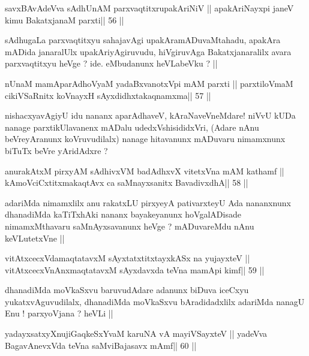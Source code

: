 \begin{shl}
savxBAvAdeVva sAdhUnAM parxvaqtitxrupakAriNiV ||
apakAriNayxpi janeV kimu BakatxjanaM parxti\hfill || 56 ||
\end{shl}

\begin{artha}
sAdhugaLa parxvaqtitxyu sahajavAgi upakAramADuvaMtahadu, apakAra
mADida janaralUlx upakAriyAgiruvudu, hiVgiruvAga Bakatxjanaralilx
avara parxvaqtitxyu heVge ? ide. eMbudanunx heVLabeVku ? ||
\end{artha}

\begin{shl}
nUnaM mamAparAdhoV\s yaM yadaBxvanotxV\s pi mAM parxti ||
parxtiloVmaM cikiVSaRnitx koV\s nayxH sAyxdidhxtakaqnamxma\hfill || 57 ||
\end{shl}

\begin{artha}
nishacxyavAgiyU idu nananx aparAdhaveV, kAraNaveVneMdare! niVvU kUDa
nanage parxtikUlavanenx mADalu udedxVshisididxVri, (Adare nAnu
beVreyAranunx koVruvudilalx) nanage  hitavanunx mADuvaru nimamxnunx
biTuTx beVre yAridAdxre ?
\end{artha}

\begin{shl}
anurakAtxM pirxyAM sAdhivxVM badAdhxvX vitetxVna mAM kathamf ||
kAmoVciCxtitxmakaqtAvx ca saMnayxsanitx BavadivxdhA\hfill || 58 ||
\end{shl}

\begin{artha}
adariMda nimamxlilx anu rakatxLU pirxyeyA pativarxteyU Ada nananxnunx
dhanadiMda kaTiTxhAki nananx bayakeyanunx hoVgalADisade nimamxMthavaru
saMnAyxsavanunx heVge ? mADuvareMdu nAnu keVLutetxVne ||
\end{artha}

\begin{shl}
vitAtxcecxVdamaqtatavxM sAyxtatxtitxtayxkASx na yujayxteV ||
vitAtxcecxVnAnxmaqtatavxM sAyxdavxda teVna mamApi kimf\hfill || 59 ||
\end{shl}

\begin{artha}
dhanadiMda moVkaSxvu baruvudAdare adanunx biDuva iceCxyu
yukatxvAguvudilalx, dhanadiMda moVkaSxvu bAradidadxlilx adariMda
nanagU Enu ! parxyoVjana ? heVLi ||
\end{artha}

\begin{shl}
yadayxsatxyXnujiGaqkeSxYvaM karuNA vA mayiVSayxteV ||
yadeVva BagavAnevxVda teVna saMviBajasavx mAmf\hfill || 60 ||
\end{shl}

